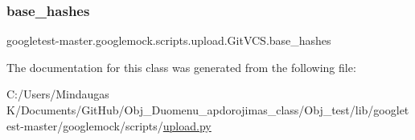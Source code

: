 \subsubsection{\texorpdfstring{base\_hashes}{base\_hashes}}
{\footnotesize\ttfamily googletest-\/master.\+googlemock.\+scripts.\+upload.\+Git\+V\+C\+S.\+base\+\_\+hashes}



The documentation for this class was generated from the following file\+:\begin{DoxyCompactItemize}
\item 
C\+:/\+Users/\+Mindaugas K/\+Documents/\+Git\+Hub/\+Obj\+\_\+\+Duomenu\+\_\+apdorojimas\+\_\+class/\+Obj\+\_\+test/lib/googletest-\/master/googlemock/scripts/\mbox{\hyperlink{_obj__test_2lib_2googletest-master_2googlemock_2scripts_2upload_8py}{upload.\+py}}\end{DoxyCompactItemize}
